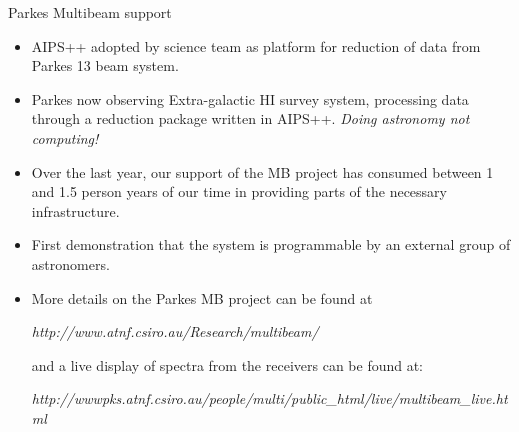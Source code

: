 \begin{slide}{Parkes Multibeam support}

\begin{itemize}
\item AIPS++ adopted by science team as platform for reduction
of data from Parkes 13 beam system.
\item Parkes now observing Extra-galactic HI survey 
system, processing data through a reduction package written in 
AIPS++. {\em Doing astronomy not computing!}
\item Over the last year, our support of
the MB project has consumed between 1 and 1.5 person years of our time
in providing parts of the necessary infrastructure.  
\item First demonstration that the system is programmable by an external 
group of astronomers.
\item More details on the Parkes MB project can be found at

{\em http://www.atnf.csiro.au/Research/multibeam/}

and a live display of spectra from the receivers can be found at:

{\em http://wwwpks.atnf.csiro.au/people/multi/public\_html/live/multibeam\_live.html}

\end{itemize}
\end{slide}

